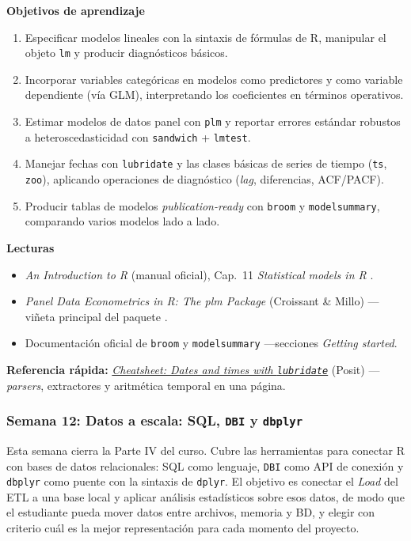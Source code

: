 \documentclass[11pt,letterpaper]{article}
\newcommand{\semana}[2]{%
  \subsubsection*{\color{main}Semana #1: #2}%
}
\newcommand{\cheatsheet}[2]{%
  \href{https://rstudio.github.io/cheatsheets/#1.pdf}{\textit{Cheatsheet: #2}}%
}
\begin{document}
\medskip
\noindent\textbf{Objetivos de aprendizaje}
\begin{enumerate}[leftmargin=*, itemsep=1pt]
    \item Especificar modelos lineales con la sintaxis de fórmulas de R, manipular el objeto \texttt{lm} y producir diagnósticos básicos.
    \item Incorporar variables categóricas en modelos como predictores y como variable dependiente (vía GLM), interpretando los coeficientes en términos operativos.
    \item Estimar modelos de datos panel con \texttt{plm} y reportar errores estándar robustos a heteroscedasticidad con \texttt{sandwich} + \texttt{lmtest}.
    \item Manejar fechas con \texttt{lubridate} y las clases básicas de series de tiempo (\texttt{ts}, \texttt{zoo}), aplicando operaciones de diagnóstico (\textit{lag}, diferencias, ACF/PACF).
    \item Producir tablas de modelos \textit{publication-ready} con \texttt{broom} y \texttt{modelsummary}, comparando varios modelos lado a lado.
\end{enumerate}

\medskip
\noindent\textbf{Lecturas}
\begin{itemize}[leftmargin=*, itemsep=1pt]
    \item \textit{An Introduction to R} (manual oficial), Cap.\ 11 \textit{Statistical models in R} \cite{rcoreteam-intro}.
    \item \textit{Panel Data Econometrics in R: The plm Package} (Croissant \& Millo) ---viñeta principal del paquete \cite{croissant-plm}.
    \item Documentación oficial de \texttt{broom} \cite{robinson-broom} y \texttt{modelsummary} \cite{arelbundock-modelsummary} ---secciones \textit{Getting started}.
\end{itemize}

\medskip
\noindent\textbf{Referencia rápida:} \cheatsheet{lubridate}{Dates and times with \texttt{lubridate}} (Posit) ---\textit{parsers}, extractores y aritmética temporal en una página.

\semana{12}{Datos a escala: SQL, \texttt{DBI} y \texttt{dbplyr}}

Esta semana cierra la Parte IV del curso. Cubre las herramientas para conectar R con bases de datos relacionales: SQL como lenguaje, \texttt{DBI} como API de conexión y \texttt{dbplyr} como puente con la sintaxis de \texttt{dplyr}. El objetivo es conectar el \textit{Load} del ETL a una base local y aplicar análisis estadísticos sobre esos datos, de modo que el estudiante pueda mover datos entre archivos, memoria y BD, y elegir con criterio cuál es la mejor representación para cada momento del proyecto.
\end{document}

